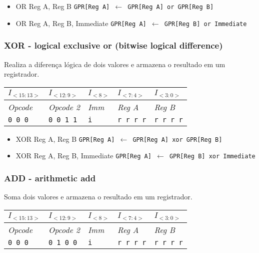 \documentclass[11pt,a4paper]{report}
\begin{document}
\begin{itemize}
\item OR Reg A, Reg B
\subitem \texttt{GPR[Reg A] $\leftarrow$ GPR[Reg A] or GPR[Reg B]}
\item OR Reg A, Reg B, Immediate
\subitem \texttt{GPR[Reg A] $\leftarrow$ GPR[Reg B] or Immediate}
\end{itemize}

\subsubsection{XOR - logical exclusive or (bitwise logical difference)}
Realiza a diferença lógica de dois valores e armazena o resultado em um
registrador.

\begin{table}[htb!]
\centering
\begin{tabular}{|p{2cm}|p{2cm}|p{2cm}|p{2cm}|p{2cm}|}
\hline
$I_{<15:13>}$ & $I_{<12:9>}$ & $I_{<8>}$ & $I_{<7:4>}$ & $I_{<3:0>}$  \\ \hline
\textit{Opcode} & \textit{Opcode 2} & \textit{Imm} & \textit{Reg A} & \textit{Reg B} \\ \hline
\texttt{0 0 0} & \texttt{0 0 1 1} & \texttt{i} & \texttt{r r r r} & \texttt{r r r r} \\ \hline
\end{tabular}
\end{table}

\begin{itemize}
\item XOR Reg A, Reg B
\subitem \texttt{GPR[Reg A] $\leftarrow$ GPR[Reg A] xor GPR[Reg B]}
\item XOR Reg A, Reg B, Immediate
\subitem \texttt{GPR[Reg A] $\leftarrow$ GPR[Reg B] xor Immediate}
\end{itemize}

\subsubsection{ADD - arithmetic add}
Soma dois valores e armazena o resultado em um registrador.

\begin{table}[htb!]
\centering
\begin{tabular}{|p{2cm}|p{2cm}|p{2cm}|p{2cm}|p{2cm}|}
\hline
$I_{<15:13>}$ & $I_{<12:9>}$ & $I_{<8>}$ & $I_{<7:4>}$ & $I_{<3:0>}$  \\ \hline
\textit{Opcode} & \textit{Opcode 2} & \textit{Imm} & \textit{Reg A} & \textit{Reg B} \\ \hline
\texttt{0 0 0} & \texttt{0 1 0 0} & \texttt{i} & \texttt{r r r r} & \texttt{r r r r} \\ \hline
\end{tabular}
\end{table}
\end{document}
